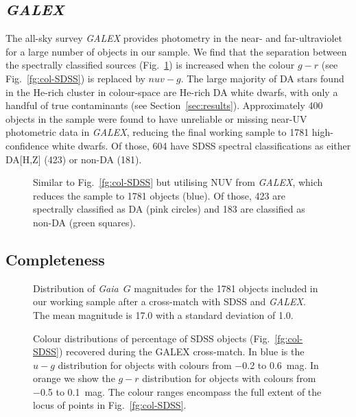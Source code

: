\documentclass[a4paper,fleqn,usenatbib]{mnras}
\newcommand{\gaia}{{\it Gaia}}
\begin{document}
\subsection{{\it GALEX}}
The all-sky survey {\it GALEX} \citep{galex} provides photometry in the near- and far-ultraviolet for a large number of objects in our sample. We find that the separation between the spectrally classified sources (Fig.~\ref{fg:col-GALEX}) is increased when the colour $g-r$ (see Fig.~\ref{fg:col-SDSS}) is replaced by $nuv-g$. The large majority of DA stars found in the He-rich cluster in colour-space are He-rich DA white dwarfs, with only a handful of true contaminants (see Section~\ref{sec:results}). Approximately 400 objects in the sample were found to have unreliable or missing near-UV photometric data in {\it GALEX}, reducing the final working sample to 1781 high-confidence white dwarfs. Of those, 604 have SDSS spectral classifications as either DA[H,Z] (423) or non-DA (181). 

\begin{figure}
 \centering
 \caption{Similar to Fig.~\ref{fg:col-SDSS} but utilising NUV from {\it GALEX}, which reduces the sample to 1781 objects (blue). Of those, 423 are spectrally classified as DA (pink circles) and 183 are classified as non-DA (green squares).}
 \label{fg:col-GALEX}
\end{figure}


\subsection{Completeness}
\begin{figure}
 \centering
  \caption{Distribution of \gaia\ $G$ magnitudes for the 1781 objects included in our working sample after a cross-match with SDSS and {\it GALEX}. The mean magnitude is 17.0 with a standard deviation of 1.0.}
 \label{fg:mag-distr}
\end{figure}

\begin{figure}
 \centering
  \caption{Colour distributions of percentage of SDSS objects (Fig.~\ref{fg:col-SDSS}) recovered during the GALEX cross-match. In blue is the $u-g$ distribution for objects with colours from $-$0.2 to 0.6~mag. In orange we show the $g-r$ distribution for objects with colours from $-$0.5 to 0.1~mag. The colour ranges encompass the full extent of the locus of points in Fig.~\ref{fg:col-SDSS}.}
 \label{fg:col-distr}
\end{figure}
\end{document}

